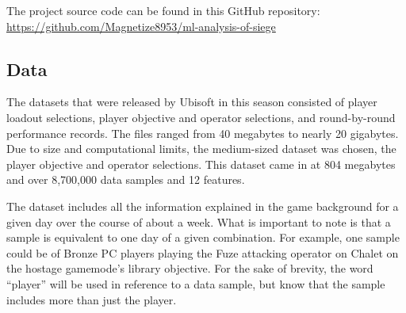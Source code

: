 \documentclass[12pt]{article}
\begin{document}
The project source code can be found in this GitHub repository:
\url{https://github.com/Magnetize8953/ml-analysis-of-siege}

\newpage

\subsection{Data}
The datasets that were released by Ubisoft in this season consisted of player loadout selections, player objective and operator selections, and round-by-round performance records.
The files ranged from 40 megabytes to nearly 20 gigabytes.
Due to size and computational limits, the medium-sized dataset was chosen, the player objective and operator selections.
This dataset came in at 804 megabytes and over 8,700,000 data samples and 12 features.

The dataset includes all the information explained in the game background for a given day over the course of about a week.
What is important to note is that a sample is equivalent to one day of a given combination.
For example, one sample could be of Bronze PC players playing the Fuze attacking operator on Chalet on the hostage gamemode's library objective.
For the sake of brevity, the word ``player'' will be used in reference to a data sample, but know that the sample includes more than just the player.

\newpage
\end{document}
